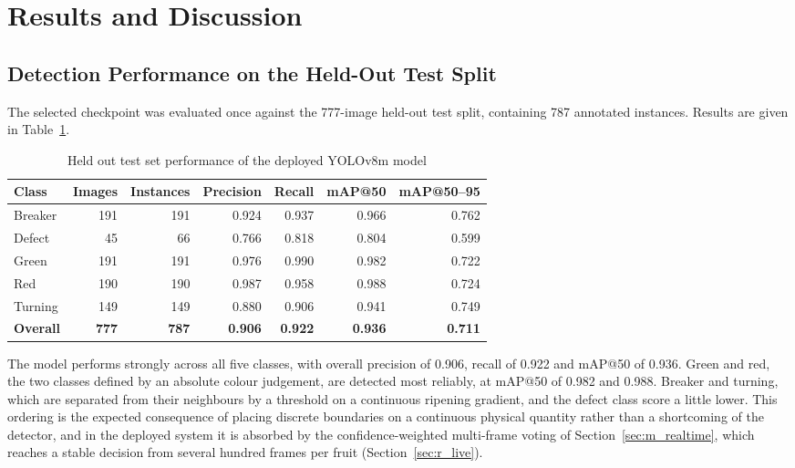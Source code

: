 \section{Results and Discussion}
\label{ch:results}


\subsection{Detection Performance on the Held-Out Test Split}
\label{sec:r_test}

The selected checkpoint was evaluated once against the 777-image held-out test split, containing 787 annotated instances. Results are given in Table~\ref{tab:testresults}.

\begin{table}[H]
\caption{Held out test set performance of the deployed YOLOv8m model}
\label{tab:testresults}
\centering
\begin{tabular}{lrrrrrr}
\toprule
\textbf{Class} & \textbf{Images} & \textbf{Instances} & \textbf{Precision} & \textbf{Recall} & \textbf{mAP@50} & \textbf{mAP@50--95} \\
\midrule
Breaker & 191 & 191 & 0.924 & 0.937 & 0.966 & 0.762 \\
Defect  & 45  & 66  & 0.766 & 0.818 & 0.804 & 0.599 \\
Green   & 191 & 191 & 0.976 & 0.990 & 0.982 & 0.722 \\
Red     & 190 & 190 & 0.987 & 0.958 & 0.988 & 0.724 \\
Turning & 149 & 149 & 0.880 & 0.906 & 0.941 & 0.749 \\
\midrule
\textbf{Overall} & \textbf{777} & \textbf{787} & \textbf{0.906} & \textbf{0.922} & \textbf{0.936} & \textbf{0.711} \\
\bottomrule
\end{tabular}
\end{table}

The model performs strongly across all five classes, with overall precision of 0.906, recall of 0.922 and mAP@50 of 0.936. Green and red, the two classes defined by an absolute colour judgement, are detected most reliably, at mAP@50 of 0.982 and 0.988. Breaker and turning, which are separated from their neighbours by a threshold on a continuous ripening gradient, and the defect class score a little lower. This ordering is the expected consequence of placing discrete boundaries on a continuous physical quantity rather than a shortcoming of the detector, and in the deployed system it is absorbed by the confidence-weighted multi-frame voting of Section~\ref{sec:m_realtime}, which reaches a stable decision from several hundred frames per fruit (Section~\ref{sec:r_live}).

